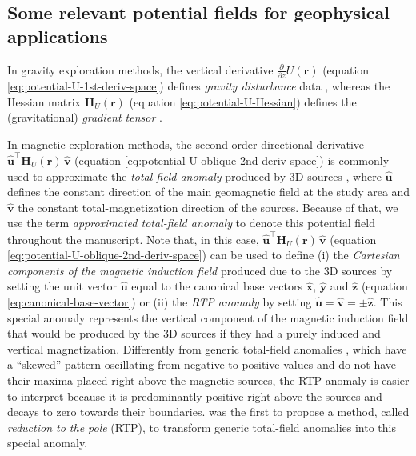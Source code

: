 \subsection{Some relevant potential fields for geophysical applications}
\label{subsec:relevant-potential-fields}

In gravity exploration methods, the vertical derivative $\tfrac{\partial}{\partial z} U(\mathbf{r})$
(equation \ref{eq:potential-U-1st-deriv-space}) defines \textit{gravity disturbance} data 
\cite[e.g.,][ p. 93]{hofmann-wellenhof-moritz2005}, whereas the Hessian matrix $\mathbf{H}_{U}(\mathbf{r})$
(equation \ref{eq:potential-U-Hessian}) defines the
(gravitational) \textit{gradient tensor} \citep[e.g.,][]{pedersen_rasmussen1990}.

In magnetic exploration methods, the second-order directional derivative 
$\hat{\mathbf{u}}^{\top} \mathbf{H}_{U}(\mathbf{r}) \, \hat{\mathbf{v}}$ (equation \ref{eq:potential-U-oblique-2nd-deriv-space})
is commonly used to approximate the \textit{total-field anomaly} produced by 3D sources \cite[e.g., ][ p. 179]{blakely1996},
where $\hat{\mathbf{u}}$ defines the constant direction of the main geomagnetic
field at the study area and $\hat{\mathbf{v}}$ the constant total-magnetization direction of the sources.
Because of that, we use the term \textit{approximated total-field anomaly} to denote this 
potential field throughout the manuscript.
Note that, in this case, $\hat{\mathbf{u}}^{\top} \mathbf{H}_{U}(\mathbf{r}) \, \hat{\mathbf{v}}$ 
(equation \ref{eq:potential-U-oblique-2nd-deriv-space}) can be used to define (i) the  
\textit{Cartesian components of the magnetic induction field} produced due to the 3D
sources by setting the unit vector $\hat{\mathbf{u}}$ equal to the canonical base vectors $\hat{\mathbf{x}}$,
$\hat{\mathbf{y}}$ and $\hat{\mathbf{z}}$ (equation \ref{eq:canonical-base-vector}) or (ii)
the \textit{RTP anomaly} by setting $\hat{\mathbf{u}} = \hat{\mathbf{v}} = \pm\hat{\mathbf{z}}$.
This special anomaly represents the vertical component of 
the magnetic induction field that would be produced by the 3D sources if they had a 
purely induced and vertical magnetization. Differently from generic total-field anomalies 
\cite[e.g.,][ p. 178]{blakely1996}, which have a ``skewed'' pattern 
oscillating from negative to positive values and do not have their maxima placed right 
above the magnetic sources, the RTP anomaly is easier to interpret 
because it is predominantly positive right above the sources and
decays to zero towards their boundaries. \citet{baranov1957} was the first
to propose a method, called \textit{reduction to the pole} (RTP), to transform generic
total-field anomalies into this special anomaly.

